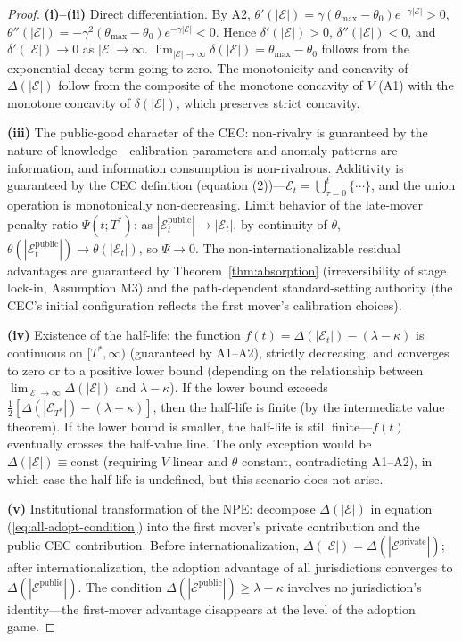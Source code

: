 \documentclass[12pt,a4paper]{article}
\theoremstyle{definition}
\theoremstyle{remark}
\begin{document}
\begin{proof}
\textbf{(i)--(ii)} Direct differentiation. By A2, $\theta'(|\mathcal{E}|) = \gamma(\theta_{\max} - \theta_0)e^{-\gamma |\mathcal{E}|} > 0$, $\theta''(|\mathcal{E}|) = -\gamma^2(\theta_{\max} - \theta_0)e^{-\gamma |\mathcal{E}|} < 0$. Hence $\delta'(|\mathcal{E}|) > 0$, $\delta''(|\mathcal{E}|) < 0$, and $\delta'(|\mathcal{E}|) \to 0$ as $|\mathcal{E}| \to \infty$. $\lim_{|\mathcal{E}| \to \infty} \delta(|\mathcal{E}|) = \theta_{\max} - \theta_0$ follows from the exponential decay term going to zero. The monotonicity and concavity of $\Delta(|\mathcal{E}|)$ follow from the composite of the monotone concavity of $V$ (A1) with the monotone concavity of $\delta(|\mathcal{E}|)$, which preserves strict concavity.

\textbf{(iii)} The public-good character of the CEC: non-rivalry is guaranteed by the nature of knowledge—calibration parameters and anomaly patterns are information, and information consumption is non-rivalrous. Additivity is guaranteed by the CEC definition (equation (2))—$\mathcal{E}_t = \bigcup_{\tau=0}^{t} \{\cdots\}$, and the union operation is monotonically non-decreasing. Limit behavior of the late-mover penalty ratio $\Psi(t; T^*)$: as $|\mathcal{E}_t^{\text{public}}| \to |\mathcal{E}_t|$, by continuity of $\theta$, $\theta(|\mathcal{E}_t^{\text{public}}|) \to \theta(|\mathcal{E}_t|)$, so $\Psi \to 0$. The non-internationalizable residual advantages are guaranteed by Theorem~\ref{thm:absorption} (irreversibility of stage lock-in, Assumption M3) and the path-dependent standard-setting authority (the CEC's initial configuration reflects the first mover's calibration choices).

\textbf{(iv)} Existence of the half-life: the function $f(t) = \Delta(|\mathcal{E}_t|) - (\lambda - \kappa)$ is continuous on $[T^*, \infty)$ (guaranteed by A1--A2), strictly decreasing, and converges to zero or to a positive lower bound (depending on the relationship between $\lim_{|\mathcal{E}| \to \infty} \Delta(|\mathcal{E}|)$ and $\lambda - \kappa$). If the lower bound exceeds $\frac{1}{2}[\Delta(|\mathcal{E}_{T^*}|) - (\lambda - \kappa)]$, then the half-life is finite (by the intermediate value theorem). If the lower bound is smaller, the half-life is still finite—$f(t)$ eventually crosses the half-value line. The only exception would be $\Delta(|\mathcal{E}|) \equiv \text{const}$ (requiring $V$ linear and $\theta$ constant, contradicting A1--A2), in which case the half-life is undefined, but this scenario does not arise.

\textbf{(v)} Institutional transformation of the NPE: decompose $\Delta(|\mathcal{E}|)$ in equation (\ref{eq:all-adopt-condition}) into the first mover's private contribution and the public CEC contribution. Before internationalization, $\Delta(|\mathcal{E}|) = \Delta(|\mathcal{E}^{\text{private}}|)$; after internationalization, the adoption advantage of all jurisdictions converges to $\Delta(|\mathcal{E}^{\text{public}}|)$. The condition $\Delta(|\mathcal{E}^{\text{public}}|) \geq \lambda - \kappa$ involves no jurisdiction's identity—the first-mover advantage disappears at the level of the adoption game.
\end{proof}
\end{document}
